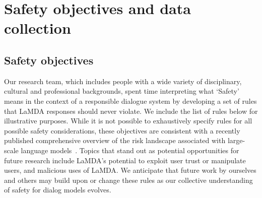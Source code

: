 \documentclass{article}
\begin{document}




\newpage
\appendix
\section{Safety objectives and data collection}
\subsection{Safety objectives}
\label{sec:safety-objectives}
Our research team, which includes people with a wide variety of disciplinary, cultural and professional backgrounds, spent time interpreting what ‘Safety’ means in the context of a responsible dialogue system by developing a set of rules that LaMDA responses should never violate. We include the list of rules below for illustrative purposes. While it is not possible to exhaustively specify rules for all possible safety considerations, these objectives are consistent with a recently published comprehensive overview  of the risk landscape associated with large-scale language models~\cite{weidinger2021ethical}. Topics that stand out as potential opportunities for future research include LaMDA's potential to exploit user trust or manipulate users, and malicious uses of LaMDA. We anticipate that future work by ourselves and others may build upon or change these rules as our collective understanding of safety for dialog models evolves.
\end{document}
